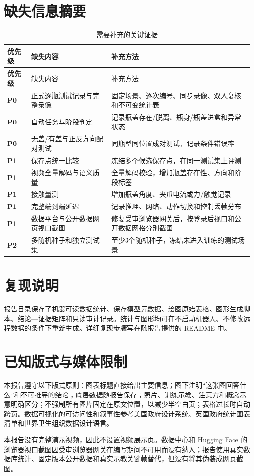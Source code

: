 \section{缺失信息摘要}

\begin{longtable}{>{\bfseries}p{18mm}p{40mm}p{65mm}}
\caption{需要补充的关键证据}\\
\toprule
优先级 & 缺失内容 & 补充方法\\
\midrule\endfirsthead
\toprule
优先级 & 缺失内容 & 补充方法\\
\midrule\endhead
P0 & 正式逐瓶测试记录与完整录像 & 固定场景、逐次编号、同步录像、双人复核和不可变统计表\\
P0 & 自动任务与阶段判定 & 记录瓶盖存在/脱离、瓶身/瓶盖进盒和异常状态\\
P0 & 无盖/有盖与正反方向配对测试 & 同瓶型同位置成对测试，记录条件错误率\\
P1 & 保存点统一比较 & 冻结多个候选保存点，在同一测试集上评测\\
P1 & 视频全量解码与语义质量 & 全量解码校验，增加瓶盖存在性、方向和阶段标签\\
P1 & 接触量测 & 增加瓶盖角度、夹爪电流或力/触觉记录\\
P1 & 完整端到端延迟 & 记录推理、网络、动作切换和控制丢帧分布\\
P1 & 数据平台与公开数据网页视口截图 & 修复受审浏览器网关后，按登录后视口和公开数据网格分别截图\\
P2 & 多随机种子和独立测试集 & 至少3个随机种子，冻结未进入训练的测试场景\\
\bottomrule
\end{longtable}

\section{复现说明}

报告目录保存了机器可读数据统计、保存模型元数据、绘图原始表格、图形生成脚本、结论—证据矩阵和只读审计记录。统计与图形均可在不启动机器人、不修改远程数据的条件下重新生成。详细复现步骤写在随报告提供的 README 中。

\section{已知版式与媒体限制}

本报告遵守以下版式原则：图表标题直接给出主要信息；图下注明“这张图回答什么”和不可推导的结论；底层数据随报告保存；照片、训练示教、注意力和概念示意明确区分；不强制所有图片固定在原文位置，以减少半空白页；表格过长时自动跨页。数据可视化的可访问性和叙事性参考美国政府设计系统、英国政府统计图表清单和世界卫生组织数据设计语言\cite{uswds_dataviz,uk_chart_checklist,who_data_design}。

本报告没有完整演示视频，因此不设置视频展示页。数据中心和 Hugging Face 的浏览器视口截图因受审浏览器网关在编写期间不可用而没有纳入；报告使用真实数据库统计、固定版本公开数据和真实示教关键帧替代，但没有将其伪装成网页截图。

